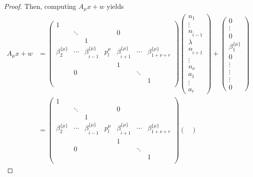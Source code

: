 \begin{proof}
Then, computing $A_{\mu}x + w$ yields
\begin{align*}
A_{\mu}x + w & = 
\begin{pmatrix}
1	& 		&		&		&		&		&	\\
	& \ddots	& 		&		& 0		& 		&	\\
	&		& 1		&		&		&		&	\\
	\beta_2^{\{\mu\}}& \cdots & \beta_{\hat{i} - 1}^{\{\mu\}} & p_l^{\mu} & \beta_{\hat{i} + 1}^{\{\mu\}}& \cdots &\beta_{1+ \nu+ r}^{\{\mu\}}\\
	& 		& 		& 		& 1		&		&	\\	
	& 0		& 		& 		&		& \ddots	&	\\	
	& 		& 		& 		&		& 		& 1	\\	
\end{pmatrix}
\begin{pmatrix}
n_1 \\ \vdots \\ n_{\hat{i} -1} \\ \lambda \\ n_{\hat{i} +1} \\ \vdots \\ n_{\nu} \\ a_1 \\ \vdots \\ a_r \end{pmatrix}
+ \begin{pmatrix}
0 \\ \vdots \\ 0 \\ \beta_1^{\{\mu\}} \\ 0\\ \vdots \\ \vdots \\ \vdots \\ 0
\end{pmatrix}\\
&= \begin{pmatrix}
1	& 		&		&		&		&		&	\\
	& \ddots	& 		&		& 0		& 		&	\\
	&		& 1		&		&		&		&	\\
	\beta_2^{\{\mu\}}& \cdots & \beta_{\hat{i} - 1}^{\{\mu\}} & p_l^{\mu} & \beta_{\hat{i} + 1}^{\{\mu\}}& \cdots &\beta_{1+ \nu+ r}^{\{\mu\}}\\
	& 		& 		& 		& 1		&		&	\\	
	& 0		& 		& 		&		& \ddots	&	\\	
	& 		& 		& 		&		& 		& 1	\\	
\end{pmatrix}\begin{pmatrix}

\end{pmatrix}
\end{align*}
\end{proof}
